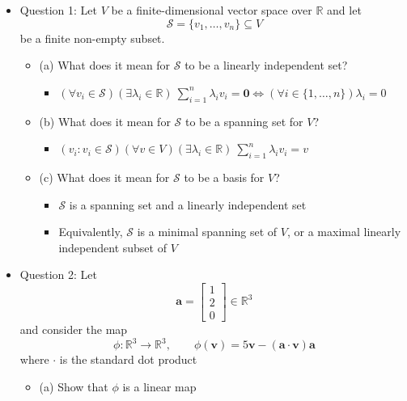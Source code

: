 \documentclass{article}
\begin{document}
\begin{itemize}
\subsection{Slide 8 (Linear Algebra: Bases and Linear Maps)}
    \item Question 1: Let $V$ be a finite-dimensional vector space over $\mathbb{R}$ and let
    \[
    \mathcal{S} = \{v_1, \dots, v_n\} \subseteq V
    \]
    be a finite non-empty subset.
    \begin{itemize}
        \item (a) What does it mean for $\mathcal{S}$ to be a linearly independent set?
        \begin{itemize}
            \item $(\forall v_i \in \mathcal{S}) (\exists \lambda_i \in \mathbb{R}) \ \sum_{i=1}^n \lambda_iv_i = \bm{0} \Longleftrightarrow (\forall i \in \{1,\dots,n\}) \lambda_i = 0$
        \end{itemize}
        \item (b) What does it mean for $\mathcal{S}$ to be a spanning set for $V$?
        \begin{itemize}
            \item $(v_i : v_i \in \mathcal{S})(\forall v \in V)(\exists \lambda_i \in \mathbb{R}) \ \sum_{i=1}^n \lambda_iv_i = v$
        \end{itemize}
        \item (c) What does it mean for $\mathcal{S}$ to be a basis for $V$?
        \begin{itemize}
            \item $\mathcal{S}$ is a spanning set and a linearly independent set
            \item Equivalently, $\mathcal{S}$ is a minimal spanning set of $V$, or a maximal linearly independent subset of $V$
        \end{itemize}
    \end{itemize}
    \item Question 2: Let
    \[
    \bm{a} = \left[ \begin{array}{c}
        1 \\ 2 \\ 0
    \end{array} \right] \in \mathbb{R}^3
    \]
    and consider the map
    \[
    \phi: \mathbb{R}^3 \rightarrow \mathbb{R}^3, \qquad \phi(\bm{v}) = 5\bm{v} - (\bm{a} \cdot \bm{v})\bm{a}
    \]
    where $\cdot$ is the standard dot product
    \begin{itemize}
        \item (a) Show that $\phi$ is a linear map

\end{itemize}
\end{itemize}
\end{document}
